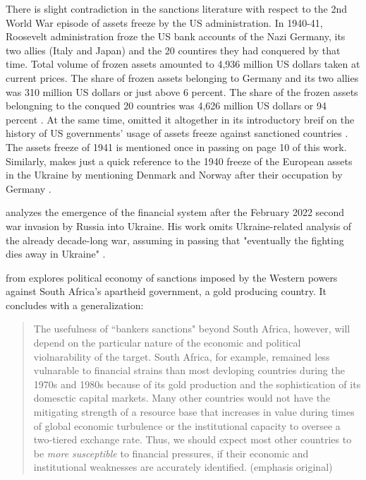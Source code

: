 There is slight contradiction in the sanctions literature with respect to the 2nd World War episode of assets freeze by the US administration.  In 1940-41, Roosevelt administration froze the US bank accounts of the Nazi Germany, its two allies (Italy and Japan) and the 20 countires they had conquered by that time. Total volume of frozen assets amounted to 4,936 million US dollars taken at current prices. The share of frozen assets belonging to Germany and its two allies was 310 million US dollars or just above 6 percent. The share of the frozen assets belongning to the conqued 20 countries was 4,626 million US dollars or 94 percent \citep[see][]{polk1941}. At the same time, \citeauthor{aler1993} omitted it altogether in its introductory breif on the history of US governments' usage of assets freeze against sanctioned countries \citep[pp.~2-3]{aler1993}. The assets freeze of 1941 is mentioned once in passing on page 10 of this work. Similarly, \citeauthor{dobson2015} makes just a quick reference to the 1940 freeze of the European assets in the Ukraine by mentioning Denmark and Norway after their occupation by Germany \cite[see][p.~41]{dobson2015}.

\citeauthor{galbraith2022} analyzes the emergence of the financial system after the February 2022 second  war invasion by Russia into Ukraine. His work omits Ukraine-related analysis of the already decade-long war, assuming in passing that  "eventually the fighting dies away in Ukraine" \citep[p.~327]{galbraith2022}.

\citep[p.~171]{carim1999} from \citep{klotz1999} explores political economy of sanctions imposed by the Western powers against South Africa's apartheid government, a gold producing country. It concludes with a generalization:

\begin{quote}
The usefulness of ``bankers sanctions" beyond South Africa, however, will depend on the particular nature of the economic and political violnarability of the target. South Africa, for example, remained less vulnarable to financial strains than most devloping countries during the 1970s and 1980s because of its gold production and the sophistication of its domesctic capital markets. Many other countries would not have the mitigating strength of a resource base that increases in value during times of global economic turbulence or the institutional capacity to oversee a two-tiered exchange rate. Thus, we should expect most other countries to be \textit{more susceptible} to financial pressures, if their economic and institutional weaknesses are accurately identified. (emphasis original)
\end{quote}

